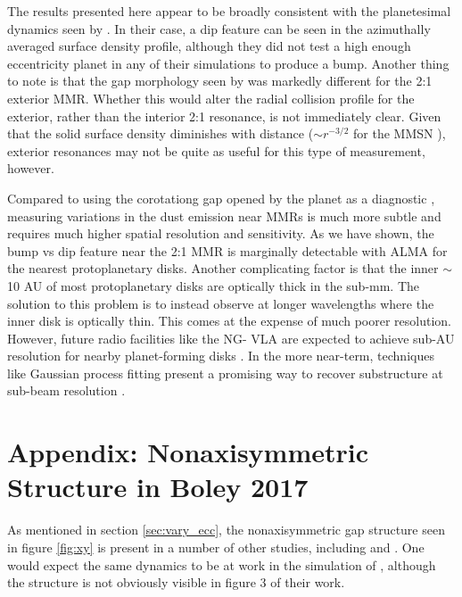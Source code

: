 \documentclass[twocolumn]{aastex63}
\begin{document}
The results presented here appear to be broadly consistent with the planetesimal dynamics seen by \citet{2016ApJ...818..159T}. In their case, a dip 
feature can be seen in the azimuthally averaged surface density profile, although they did not test a high enough eccentricity planet in any of their 
simulations to produce a bump. Another thing to note is that the gap morphology seen by \citet{2016ApJ...818..159T} was markedly different for the 
2:1 exterior MMR. Whether this would alter the radial collision profile for the exterior, rather than the interior 2:1 resonance, is not immediately clear.  
Given that the solid surface density diminishes with distance ($\sim r^{-3/2}$ for the MMSN \citep{1981PThPS..70...35H}), exterior resonances may 
not be quite as useful for this type of measurement, however.

Compared to using the corotationg gap opened by the planet as a diagnostic \citep{2013ApJ...777L..31D, 2016ApJ...820...29D}, measuring 
variations in the dust emission near MMRs is much more subtle and requires much higher spatial resolution and sensitivity. As we have shown, the 
bump vs dip feature near the 2:1 MMR is marginally detectable with ALMA for the nearest protoplanetary disks. Another complicating factor is that 
the inner $\sim$ 10 AU of most protoplanetary disks are optically thick in the sub-mm. The solution to this problem is to instead observe at longer 
wavelengths where the inner disk is optically thin. This comes at the expense of much poorer resolution. However, future radio facilities like the NG-
VLA are expected to achieve sub-AU resolution for nearby planet-forming disks \citep{2018ASPC..517..147R}. In the more near-term, techniques 
like Gaussian process fitting present a promising way to recover substructure at sub-beam resolution \citep{2020arXiv200507709J}.



\clearpage

\section{Appendix: Nonaxisymmetric Structure in Boley 2017}\label{sec:boley_plot}

As mentioned in section \ref{sec:vary_ecc}, the nonaxisymmetric gap structure seen in figure \ref{fig:xy} is present in a number of other studies,
including \citet{2000Icar..143...45R} and \citet{2016ApJ...818..159T}. One would expect the same dynamics to be at work in the simulation of 
\citet{2017ApJ...850..103B}, although the structure is not obviously visible in figure 3 of their work.
\end{document}
